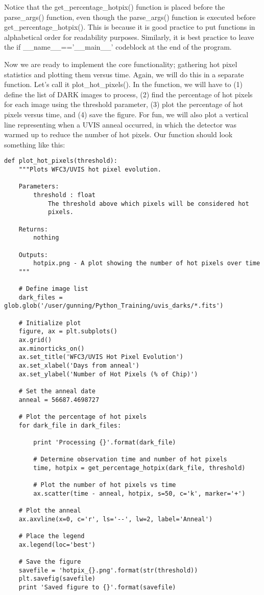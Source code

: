 Notice that the {\sf\small get\_percentage\_hotpix()} function is placed before the {\sf\small parse\_args()}
function, even though the {\sf\small parse\_args()} function is executed before {\sf\small get\_percentage\_hotpix()}.
This is because it is good practice to put functions in alphabetical order for readability
purposes.  Similarly, it is best practice to leave the {\sf\small if \_\_name\_\_=='\_\_main\_\_'} codeblock
at the end of the program.

Now we are ready to implement the core functionality; gathering hot pixel statistics and
plotting them versus time.  Again, we will do this in a separate function.  Let's call it {\sf\small plot\_hot\_pixels()}.
In the function, we will have to (1) define the list of DARK images to process, (2) find the percentage
of hot pixels for each image using the threshold parameter, (3) plot the percentage of hot 
pixels versus time, and (4) save the figure.  For fun, we will also plot a vertical line 
representing when a UVIS anneal occurred, in which the detector was warmed up to reduce the 
number of hot pixels.  Our function should look something like this:

\begin{verbatim}
def plot_hot_pixels(threshold):
    """Plots WFC3/UVIS hot pixel evolution.

    Parameters:
        threshold : float
            The threshold above which pixels will be considered hot
            pixels.

    Returns:
        nothing

    Outputs:
        hotpix.png - A plot showing the number of hot pixels over time
    """

    # Define image list
    dark_files = glob.glob('/user/gunning/Python_Training/uvis_darks/*.fits')

    # Initialize plot
    figure, ax = plt.subplots()
    ax.grid()
    ax.minorticks_on()
    ax.set_title('WFC3/UVIS Hot Pixel Evolution')
    ax.set_xlabel('Days from anneal')
    ax.set_ylabel('Number of Hot Pixels (% of Chip)')

    # Set the anneal date
    anneal = 56687.4698727

    # Plot the percentage of hot pixels
    for dark_file in dark_files:

        print 'Processing {}'.format(dark_file)

        # Determine observation time and number of hot pixels
        time, hotpix = get_percentage_hotpix(dark_file, threshold)

        # Plot the number of hot pixels vs time
        ax.scatter(time - anneal, hotpix, s=50, c='k', marker='+')

    # Plot the anneal
    ax.axvline(x=0, c='r', ls='--', lw=2, label='Anneal')

    # Place the legend
    ax.legend(loc='best')

    # Save the figure
    savefile = 'hotpix_{}.png'.format(str(threshold))
    plt.savefig(savefile)
    print 'Saved figure to {}'.format(savefile)
\end{verbatim}

